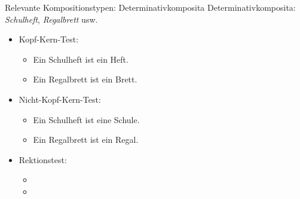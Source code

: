 \begin{frame}
  {Relevante Kompositionstypen: Determinativkomposita}
  \pause
  Determinativkomposita: \textit{Schulheft}, \textit{Regalbrett} usw.
  \pause
  \Halbzeile
  \begin{itemize}[<+->]
    \item Kopf-Kern-Test:
      \begin{itemize}[<+->]
        \item Ein Schulheft ist ein Heft. \Ck
        \item Ein Regalbrett ist ein Brett. \Ck
      \end{itemize}
    \item Nicht-Kopf-Kern-Test:
      \begin{itemize}[<+->]
        \item Ein Schulheft ist eine Schule. \Fl
        \item Ein Regalbrett ist ein Regal. \Fl
      \end{itemize}
      \Halbzeile
    \item Rektionstest:
      \begin{itemize}[<+->]
        \item {}
        \item {}
      \end{itemize}
  \end{itemize}
\end{frame}


